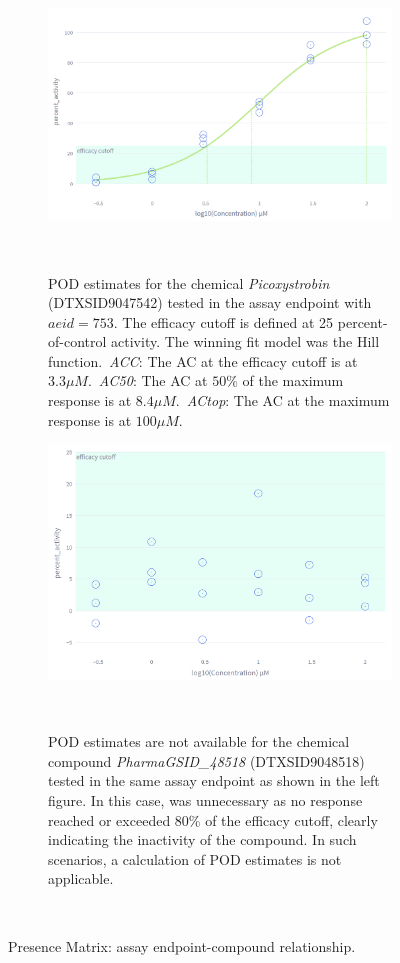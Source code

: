 \begin{figure}[htbp]
    \centering
    \begin{subfigure}[b]{0.48\textwidth}
        \centering
        \includegraphics[width=\textwidth]{figures/POD.png}
        \caption{POD estimates for the chemical \emph{Picoxystrobin} (DTXSID9047542) tested in the assay endpoint with $aeid=753$. The efficacy cutoff is defined at 25 percent-of-control activity. The winning fit model was the Hill function.~\emph{ACC}: The AC at the efficacy cutoff is at $3.3 \mu M$.~\emph{AC50}: The AC at $50\%$ of the maximum response is at $8.4 \mu M$.~\emph{ACtop}: The AC at the maximum response is at $100 \mu M$.}
    ~\label{fig:active_and_pod}
    \end{subfigure}
    \hfill
    \begin{subfigure}[b]{0.48\textwidth}
        \centering
        \includegraphics[width=\textwidth]{figures/inactive_and_no_pod.png}
        \caption{POD estimates are not available for the chemical compound \emph{PharmaGSID\_48518} (DTXSID9048518) tested in the same assay endpoint as shown in the left figure. In this case, was unnecessary as no response reached or exceeded $80\%$ of the efficacy cutoff, clearly indicating the inactivity of the compound. In such scenarios, a calculation of POD estimates is not applicable.}
        ~\label{fig:inactive_and_no_pod}
    \end{subfigure}
    \caption{Presence Matrix: assay endpoint-compound relationship.}
    ~\label{fig:pod}
\end{figure}



